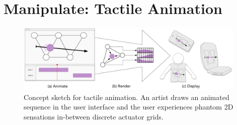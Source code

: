 %
%
%
%
%
%
%
%
%
%



\chapter{Manipulate: Tactile Animation}
\label{ch:tactileanimation}

\begin{figure}[h]
   \includegraphics[width=0.98\textwidth]{images/HA14-Concept-Sketch-2015-01-17-1127}
   \caption{Concept sketch for tactile animation. 
An artist draws an animated sequence in the user interface and the user experiences phantom 2D sensations in-between discrete actuator grids. 
}
   \label{fig:concept:sketch}
\end{figure}

